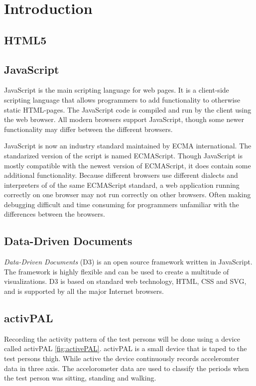 \chapter{Introduction} %

\label{Chapter2} %


\section{HTML5}


\section{JavaScript}
JavaScript is the main scripting language for web pages. It is a client-side scripting language that allows programmers to add functionality to otherwise static HTML-pages. The JavaScript code is compiled and run by the client using the web browser. All modern browsers support JavaScript, though some newer functionality may differ between the different browsers.

JavaScript is now an industry standard maintained by ECMA international. The standarized version of the script is named ECMAScript. Though JavaScript is mostly compatible with the newest version of ECMAScript, it does contain some additional functionality. Because different browsers use different dialects and interpreters of of the same ECMAScript standard, a web application running correctly on one browser may not run correctly on other browsers. Often making debugging difficult and time consuming for programmers unfamiliar with the differences between the browsers. 
        
\section{Data-Driven Documents}
\emph{Data-Driven Documents} (D3) is an open source framework written in JavaScript. The framework is highly flexible and can be used to create a multitude of visualizations. D3 is based on standard web technology, HTML, CSS and SVG, and is supported by all the major Internet browsers.

\section{activPAL}
Recording the activity pattern of the test persons will be done using a device called activPAL \ref{fig:activePAL}. activPAL is a small device that is taped to the test persons thigh. While active the device continuously records acceleromter data in three axis. The accelorometer data are used to classify the periods when the test person was sitting, standing and walking.


